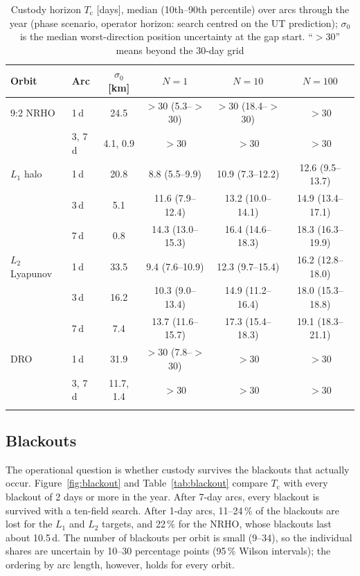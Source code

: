 \documentclass[pdflatex,sn-mathphys-num]{sn-jnl}
\newcommand{\Tc}{T_{\mathrm{c}}}
\begin{document}
\begin{table}[t]
\caption{Custody horizon $\Tc$ [days], median (10th--90th percentile) over arcs through the year
(phase scenario, operator horizon: search centred on the UT prediction); $\sigma_0$ is the median worst-direction position uncertainty at
the gap start. ``$>$30'' means beyond the 30-day grid}\label{tab:tc}
\begin{tabular*}{\textwidth}{@{\extracolsep\fill}llcccc}
\toprule
Orbit & Arc & $\sigma_0$ [km] & $N=1$ & $N=10$ & $N=100$\\
\midrule
9:2 NRHO       & 1\,d & 24.5 & $>$30 (5.3--$>$30) & $>$30 (18.4--$>$30) & $>$30\\
               & 3, 7\,d & 4.1, 0.9 & $>$30 & $>$30 & $>$30\\
$L_1$ halo     & 1\,d & 20.8 & 8.8 (5.5--9.9)   & 10.9 (7.3--12.2)  & 12.6 (9.5--13.7)\\
               & 3\,d & 5.1  & 11.6 (7.9--12.4) & 13.2 (10.0--14.1) & 14.9 (13.4--17.1)\\
               & 7\,d & 0.8  & 14.3 (13.0--15.3) & 16.4 (14.6--18.3) & 18.3 (16.3--19.9)\\
$L_2$ Lyapunov & 1\,d & 33.5 & 9.4 (7.6--10.9)  & 12.3 (9.7--15.4)  & 16.2 (12.8--18.0)\\
               & 3\,d & 16.2 & 10.3 (9.0--13.4) & 14.9 (11.2--16.4) & 18.0 (15.3--18.8)\\
               & 7\,d & 7.4  & 13.7 (11.6--15.7) & 17.3 (15.4--18.3) & 19.1 (18.3--21.1)\\
DRO            & 1\,d & 31.9 & $>$30 (7.8--$>$30) & $>$30 & $>$30\\
               & 3, 7\,d & 11.7, 1.4 & $>$30 & $>$30 & $>$30\\
\botrule
\end{tabular*}
\end{table}

\subsection{Blackouts}
The operational question is whether custody survives the blackouts that actually occur.
Figure~\ref{fig:blackout} and Table~\ref{tab:blackout} compare $\Tc$ with every blackout of 2 days
or more in the year. After 7-day arcs, every blackout is survived with a ten-field search. After
1-day arcs, 11--24\,\% of the blackouts are lost for the $L_1$ and $L_2$ targets, and 22\,\% for
the NRHO, whose blackouts last about 10.5\,d. The number of blackouts per orbit is small (9--34),
so the individual shares are uncertain by 10--30 percentage points (95\,\% Wilson intervals); the
ordering by arc length, however, holds for every orbit.
\end{document}
